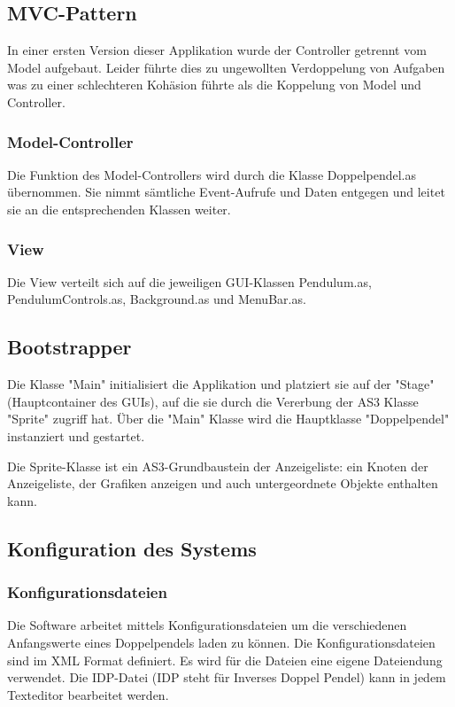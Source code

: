 \documentclass[12pt]{article}
\numberwithin{equation}{subsection}
\begin{document}
\subsection{MVC-Pattern}
In einer ersten Version dieser Applikation wurde der Controller getrennt vom Model aufgebaut. Leider führte dies zu ungewollten Verdoppelung von Aufgaben was zu einer schlechteren Kohäsion führte als die Koppelung von Model und Controller.

\subsubsection{Model-Controller}
Die Funktion des Model-Controllers wird durch die Klasse Doppelpendel.as übernommen. Sie nimmt sämtliche Event-Aufrufe und Daten entgegen und leitet sie an die entsprechenden Klassen weiter.

\subsubsection{View}
Die View verteilt sich auf die jeweiligen GUI-Klassen Pendulum.as, PendulumControls.as, Background.as und MenuBar.as.


\subsection{Bootstrapper}
Die Klasse "Main" initialisiert die Applikation und platziert sie auf der "Stage" (Hauptcontainer des GUIs), auf die sie durch die Vererbung der AS3 Klasse "Sprite" zugriff hat. Über die "Main" Klasse wird die Hauptklasse "Doppelpendel" instanziert und gestartet. 

Die Sprite-Klasse ist ein AS3-Grundbaustein der Anzeigeliste: ein Knoten der Anzeigeliste, der Grafiken anzeigen und auch untergeordnete Objekte enthalten kann.

\subsection{Konfiguration des Systems}

\subsubsection{Konfigurationsdateien}
Die Software arbeitet mittels Konfigurationsdateien um die verschiedenen Anfangswerte eines Doppelpendels laden zu können. Die Konfigurationsdateien sind im XML Format definiert. Es wird für die Dateien eine eigene Dateiendung verwendet. Die IDP-Datei (IDP steht für Inverses Doppel Pendel) kann in jedem Texteditor bearbeitet werden.
\end{document}
